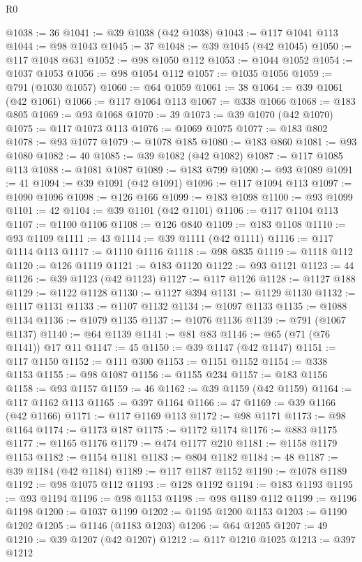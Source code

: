 \begin{lexlean}{R0}
\begin{coremodule}
@1038 := 36
@1041 := @39 @1038 (@42 @1038)
@1043 := @117 @1041 @113
@1044 := @98 @1043
@1045 := 37
@1048 := @39 @1045 (@42 @1045)
@1050 := @117 @1048 @631
@1052 := @98 @1050 @112
@1053 := @1044 @1052
@1054 := @1037 @1053
@1056 := @98 @1054 @112
@1057 := @1035 @1056
@1059 := @791 (@1030 @1057)
@1060 := @64 @1059
@1061 := 38
@1064 := @39 @1061 (@42 @1061)
@1066 := @117 @1064 @113
@1067 := @338 @1066
@1068 := @183 @805
@1069 := @93 @1068
@1070 := 39
@1073 := @39 @1070 (@42 @1070)
@1075 := @117 @1073 @113
@1076 := @1069 @1075
@1077 := @183 @802
@1078 := @93 @1077
@1079 := @1078 @185
@1080 := @183 @860
@1081 := @93 @1080
@1082 := 40
@1085 := @39 @1082 (@42 @1082)
@1087 := @117 @1085 @113
@1088 := @1081 @1087
@1089 := @183 @799
@1090 := @93 @1089
@1091 := 41
@1094 := @39 @1091 (@42 @1091)
@1096 := @117 @1094 @113
@1097 := @1090 @1096
@1098 := @126 @166
@1099 := @183 @1098
@1100 := @93 @1099
@1101 := 42
@1104 := @39 @1101 (@42 @1101)
@1106 := @117 @1104 @113
@1107 := @1100 @1106
@1108 := @126 @840
@1109 := @183 @1108
@1110 := @93 @1109
@1111 := 43
@1114 := @39 @1111 (@42 @1111)
@1116 := @117 @1114 @113
@1117 := @1110 @1116
@1118 := @98 @835
@1119 := @1118 @112
@1120 := @126 @1119
@1121 := @183 @1120
@1122 := @93 @1121
@1123 := 44
@1126 := @39 @1123 (@42 @1123)
@1127 := @117 @1126
@1128 := @1127 @188
@1129 := @1122 @1128
@1130 := @1127 @394
@1131 := @1129 @1130
@1132 := @1117 @1131
@1133 := @1107 @1132
@1134 := @1097 @1133
@1135 := @1088 @1134
@1136 := @1079 @1135
@1137 := @1076 @1136
@1139 := @791 (@1067 @1137)
@1140 := @64 @1139
@1141 := @81 @83
@1146 := @65 (@71 (@76 @1141)) @17 @11
@1147 := 45
@1150 := @39 @1147 (@42 @1147)
@1151 := @117 @1150
@1152 := @111 @300
@1153 := @1151 @1152
@1154 := @338 @1153
@1155 := @98 @1087
@1156 := @1155 @234
@1157 := @183 @1156
@1158 := @93 @1157
@1159 := 46
@1162 := @39 @1159 (@42 @1159)
@1164 := @117 @1162 @113
@1165 := @397 @1164
@1166 := 47
@1169 := @39 @1166 (@42 @1166)
@1171 := @117 @1169 @113
@1172 := @98 @1171
@1173 := @98 @1164
@1174 := @1173 @187
@1175 := @1172 @1174
@1176 := @883 @1175
@1177 := @1165 @1176
@1179 := @474 @1177 @210
@1181 := @1158 @1179 @1153
@1182 := @1154 @1181
@1183 := @804 @1182
@1184 := 48
@1187 := @39 @1184 (@42 @1184)
@1189 := @117 @1187 @1152
@1190 := @1078 @1189
@1192 := @98 @1075 @112
@1193 := @128 @1192
@1194 := @183 @1193
@1195 := @93 @1194
@1196 := @98 @1153
@1198 := @98 @1189 @112
@1199 := @1196 @1198
@1200 := @1037 @1199
@1202 := @1195 @1200 @1153
@1203 := @1190 @1202
@1205 := @1146 (@1183 @1203)
@1206 := @64 @1205
@1207 := 49
@1210 := @39 @1207 (@42 @1207)
@1212 := @117 @1210 @1025
@1213 := @397 @1212

\end{coremodule}
\end{lexlean}
